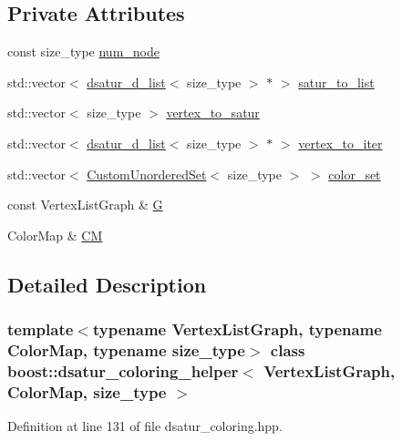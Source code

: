 \subsection*{Private Attributes}
\begin{DoxyCompactItemize}
\item 
const size\+\_\+type \hyperlink{classboost_1_1dsatur__coloring__helper_a7599ccb056c17e00e975b9af8e16f29d}{num\+\_\+node}
\item 
std\+::vector$<$ \hyperlink{structboost_1_1dsatur__d__list}{dsatur\+\_\+d\+\_\+list}$<$ size\+\_\+type $>$ $\ast$ $>$ \hyperlink{classboost_1_1dsatur__coloring__helper_af04425ecf899eee484685374be577c4d}{satur\+\_\+to\+\_\+list}
\item 
std\+::vector$<$ size\+\_\+type $>$ \hyperlink{classboost_1_1dsatur__coloring__helper_a19707dd47b634e8d1818d7583ee30f9d}{vertex\+\_\+to\+\_\+satur}
\item 
std\+::vector$<$ \hyperlink{structboost_1_1dsatur__d__list}{dsatur\+\_\+d\+\_\+list}$<$ size\+\_\+type $>$ $\ast$ $>$ \hyperlink{classboost_1_1dsatur__coloring__helper_abcf3872c0cc7f404e27d03ab3c22e2f5}{vertex\+\_\+to\+\_\+iter}
\item 
std\+::vector$<$ \hyperlink{classCustomUnorderedSet}{Custom\+Unordered\+Set}$<$ size\+\_\+type $>$ $>$ \hyperlink{classboost_1_1dsatur__coloring__helper_a3a8f27a4c2da00293736b71ac6f900c5}{color\+\_\+set}
\item 
const Vertex\+List\+Graph \& \hyperlink{classboost_1_1dsatur__coloring__helper_a310cbe27101949365b073d30a5b3f32f}{G}
\item 
Color\+Map \& \hyperlink{classboost_1_1dsatur__coloring__helper_a542a95aaddde529e2ab8a11cb5535010}{CM}
\end{DoxyCompactItemize}


\subsection{Detailed Description}
\subsubsection*{template$<$typename Vertex\+List\+Graph, typename Color\+Map, typename size\+\_\+type$>$\newline
class boost\+::dsatur\+\_\+coloring\+\_\+helper$<$ Vertex\+List\+Graph, Color\+Map, size\+\_\+type $>$}



Definition at line 131 of file dsatur\+\_\+coloring.\+hpp.



